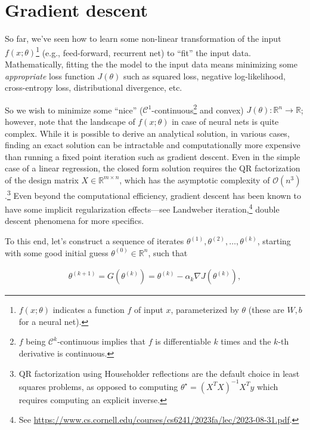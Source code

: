 \section{Gradient descent}
\label{sec:1}

So far, we've seen how to learn some non-linear transformation of the input $f(x; \theta)$\footnote{$f(x; \theta)$ indicates a function $f$ of input $x$, parameterized by $\theta$ (these are $W, b$ for a neural net).} (e.g., feed-forward, recurrent net) to ``fit'' the input data. Mathematically, fitting the the model to the input data means minimizing some \textit{appropriate} loss function $J(\theta)$ such as squared loss, negative log-likelihood, cross-entropy loss, distributional divergence, etc.

So we wish to minimize some ``nice'' ($\mathscr{C}^1$-continuous\footnote{$f$ being $\mathscr{C}^k$-continuous implies that $f$ is differentiable $k$ times and the $k$-th derivative is continuous.} and convex) $J(\theta): \mathbb{R}^n \rightarrow \mathbb{R}$; however, note that the landscape of $f(x; \theta)$ in case of neural nets is quite complex. While it is possible to derive an analytical solution, in various cases, finding an exact solution can be intractable and computationally more expensive than running a fixed point iteration such as gradient descent. Even in the simple case of a linear regression, the closed form solution requires the QR factorization of the design matrix $X \in \mathbb{R}^{m \times n}$, which has the asymptotic complexity of $\mathcal{O}(n^3)$.\footnote{QR factorization using Householder reflections are the default choice in least squares problems, as opposed to computing $\theta^\star = (X^TX)^{-1}X^T y$ which requires computing an explicit inverse.} Even beyond the computational efficiency, gradient descent has been known to have some implicit regularization effects---see Landweber iteration,\footnote{See \url{https://www.cs.cornell.edu/courses/cs6241/2023fa/lec/2023-08-31.pdf}.} double descent phenomena \cite{belkin2019reconciling} for more specifics.

To this end, let's construct a sequence of iterates $\theta^{(1)}, \theta^{(2)}, \dotsc, \theta^{(k)}$, starting with some good initial guess $\theta^{(0)} \in \mathbb{R}^n$, such that

\begin{align}
\label{eq:1}
\theta^{(k+1)} = G\left(\theta^{(k)}\right) = \theta^{(k)} - \alpha_k \nabla J(\theta^{(k)}),
\end{align}

